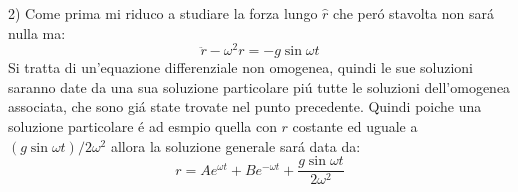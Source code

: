 \documentclass[../main.tex]{subfiles}
\begin{document}
2) Come prima mi riduco a studiare la forza lungo $\hat{r}$ che per\'{o} stavolta non sar\'{a} nulla ma:
\begin{equation}\label{AV4}
  \ddot{r}-\omega^2r=-g \sin{\omega t}
 \end{equation}
Si tratta di un'equazione differenziale non omogenea, quindi le sue soluzioni saranno date da una sua soluzione particolare pi\'{u} tutte le soluzioni dell'omogenea associata,
che sono gi\'{a} state trovate nel punto precedente. Quindi poiche una soluzione particolare \'{e} ad esmpio quella con $r$ costante ed uguale a 
$(g \sin{\omega t})/2\omega^2$ allora la soluzione generale sar\'{a} data da:
\begin{equation}\label{AV5}
 r=Ae^{\omega t}+Be^{-\omega t}+\frac{g \sin{\omega t}}{2\omega^2}
\end{equation}
\end{document}
